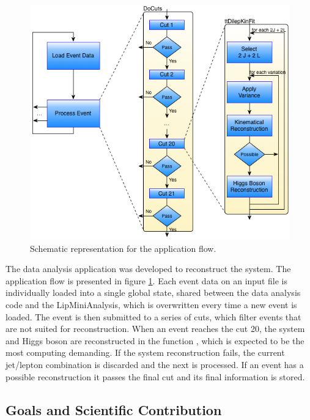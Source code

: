 \begin{figure}[!htp]
	\begin{center}
		\includegraphics[scale=0.5]{imgs/graf_abstract_flow_with_kinfit.png}
		\caption{Schematic representation for the \tth application flow.}
		\label{fig:flow}
	\end{center}
\end{figure}

The \tth data analysis application was developed to reconstruct the \ttH system. The application flow is presented in figure \ref{fig:flow}. Each event data on an input file is individually loaded into a single global state, shared between the data analysis code and the LipMiniAnalysis, which is overwritten every time a new event is loaded. The event is then submitted to a series of cuts, which filter events that are not suited for reconstruction. When an event reaches the cut 20, the \ttbar system and Higgs boson are reconstructed in the function \ttDilepKinFit, which is expected to be the most computing demanding. If the \ttbar system reconstruction fails, the current jet/lepton combination is discarded and the next is processed. If an event has a possible reconstruction it passes the final cut and its final information is stored.

\subsection{Goals and Scientific Contribution}
\label{goals}

